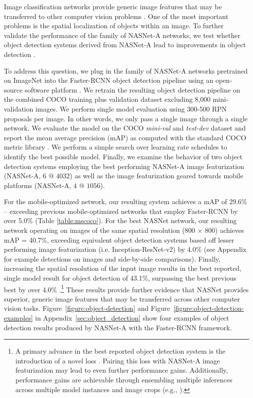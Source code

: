 Image classification networks provide generic image features that may be transferred to other computer vision problems \cite{donahue2014decaf}. One of the most important problems is the spatial localization of objects within an image. To further validate the  performance of the family of NASNet-A networks, we test whether object detection systems derived from NASNet-A lead to improvements in object detection \cite{huang2016speed}.

To address this question, we plug in the family of NASNet-A networks pretrained on ImageNet into the Faster-RCNN object detection pipeline \cite{faster_rcnn} using an open-source software platform \cite{huang2016speed}. We retrain the resulting object detection pipeline on the combined COCO training plus validation dataset excluding 8,000 mini-validation images.
We perform single model evaluation using 300-500 RPN proposals per image. In other words, we only
pass a single image through a single network. We evaluate the model on the COCO {\it mini-val} \cite{huang2016speed} and {\it test-dev} dataset and report the mean average precision (mAP) as computed with the standard COCO metric library \cite{lin2014microsoft}. We perform a simple search over learning rate schedules to identify the best possible model. Finally, we examine the behavior of two object detection systems employing the best performing NASNet-A image featurization (NASNet-A, $6$ @ $4032$) as well as the image featurization geared towards mobile platforms (NASNet-A, $4$ @ $1056$).

For the mobile-optimized network, our resulting system achieves a mAP of 29.6\% -- exceeding previous mobile-optimized networks that employ Faster-RCNN by over 5.0\% (Table \ref{table:mscoco}). For the best NASNet network, our resulting network operating on images of the same spatial resolution (800 $\times$ 800) achieves mAP = 40.7\%, exceeding equivalent object detection systems based off lesser performing image featurization (i.e. Inception-ResNet-v2) by 4.0\% \cite{huang2016speed,shrivastava2016beyond} (see Appendix for example detections on images and side-by-side comparisons). Finally, increasing the spatial resolution of the input image results in the best reported, single model result for object detection of 43.1\%, surpassing the best previous best by over 4.0\% \cite{lin2017focal}.\footnote{A primary advance in the best reported object detection system is the introduction of a novel loss \cite{lin2017focal}. Pairing this loss with NASNet-A image featurization may lead to even further performance gains. Additionally, performance gains are achievable through ensembling multiple inferences across multiple model instances and image crops (e.g., \cite{huang2016speed}).} These results provide further evidence that NASNet provides superior, generic image features that may be transferred across other computer vision tasks. Figure~\ref{figure:object-detection} and Figure~\ref{figure:object-detection-examples} in Appendix~\ref{sec:object_detection} show four examples of object detection results produced by NASNet-A with the Faster-RCNN framework.

